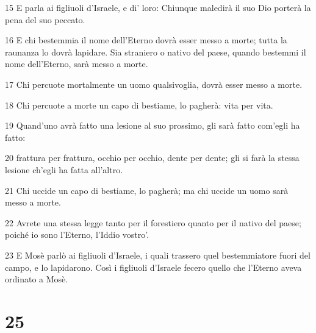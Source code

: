 \par 15 E parla ai figliuoli d'Israele, e di' loro: Chiunque maledirà il suo Dio porterà la pena del suo peccato.
\par 16 E chi bestemmia il nome dell'Eterno dovrà esser messo a morte; tutta la raunanza lo dovrà lapidare. Sia straniero o nativo del paese, quando bestemmi il nome dell'Eterno, sarà messo a morte.
\par 17 Chi percuote mortalmente un uomo qualsivoglia, dovrà esser messo a morte.
\par 18 Chi percuote a morte un capo di bestiame, lo pagherà: vita per vita.
\par 19 Quand'uno avrà fatto una lesione al suo prossimo, gli sarà fatto com'egli ha fatto:
\par 20 frattura per frattura, occhio per occhio, dente per dente; gli si farà la stessa lesione ch'egli ha fatta all'altro.
\par 21 Chi uccide un capo di bestiame, lo pagherà; ma chi uccide un uomo sarà messo a morte.
\par 22 Avrete una stessa legge tanto per il forestiero quanto per il nativo del paese; poiché io sono l'Eterno, l'Iddio vostro'.
\par 23 E Mosè parlò ai figliuoli d'Israele, i quali trassero quel bestemmiatore fuori del campo, e lo lapidarono. Così i figliuoli d'Israele fecero quello che l'Eterno aveva ordinato a Mosè.

\chapter{25}

